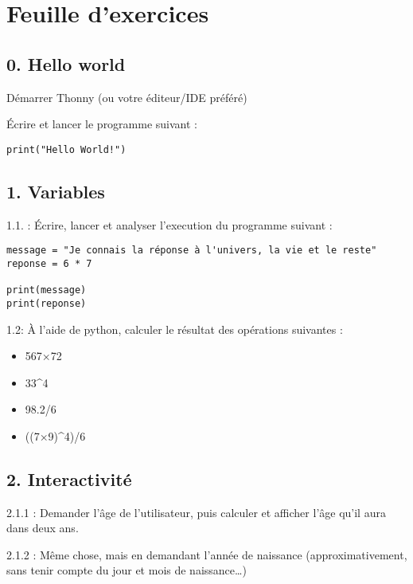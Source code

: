 \documentclass[]{article}
\date{}
\providecommand{\tightlist}{%
  \setlength{\itemsep}{0pt}\setlength{\parskip}{0pt}}
\begin{document}
\hypertarget{feuille-dexercices}{%
\section{Feuille d'exercices}\label{feuille-dexercices}}

\hypertarget{hello-world}{%
\subsection{0. Hello world}\label{hello-world}}

Démarrer Thonny (ou votre éditeur/IDE préféré)

Écrire et lancer le programme suivant :

\begin{verbatim}
print("Hello World!")
\end{verbatim}

\hypertarget{variables}{%
\subsection{1. Variables}\label{variables}}

1.1. : Écrire, lancer et analyser l'execution du programme suivant :

\begin{verbatim}
message = "Je connais la réponse à l'univers, la vie et le reste"
reponse = 6 * 7

print(message)
print(reponse)
\end{verbatim}

1.2: À l'aide de python, calculer le résultat des opérations suivantes :

\begin{itemize}
\tightlist
\item
  567×72
\item
  33\^{}4
\item
  98.2/6
\item
  ((7×9)\^{}4)/6
\end{itemize}

\hypertarget{interactivituxe9}{%
\subsection{2. Interactivité}\label{interactivituxe9}}

2.1.1 : Demander l'âge de l'utilisateur, puis calculer et afficher l'âge
qu'il aura dans deux ans.

2.1.2 : Même chose, mais en demandant l'année de naissance
(approximativement, sans tenir compte du jour et mois de
naissance\ldots{})
\end{document}
